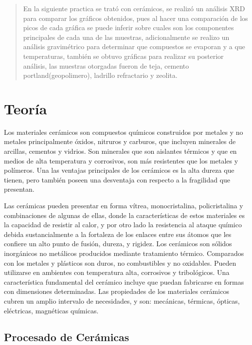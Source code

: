 \documentclass[a4paper, 11pt]{article}
\begin{document}
\renewcommand{\contentsname}{Lista de Contenidos}
\renewcommand{\listfigurename}{Lista de Figuras}
\tableofcontents
\listoffigures
\thispagestyle{empty}
\newpage
\newcommand{\angstrom}{\mbox{\normalfont\AA}}
\begin{abstract}
En la siguiente practica se trató con cerámicos, se realizó un análisis XRD para comparar los gráficos obtenidos, pues al hacer una comparación de los picos de cada gráfica se puede inferir sobre cuales son los componentes principales de cada una de las muestras, adicionalmente se realizo un análisis gravimétrico para determinar que compuestos se evaporan y a que temperaturas, también se obtuvo gráficas para realizar su posterior análisis, las muestras otorgadas fueron de teja, cemento portland(geopolimero), ladrillo refractario y zeolita.
\end{abstract}
\section{Teor\'ia}
\setcounter{page}{1}
Los materiales cerámicos son compuestos químicos construidos por metales y no metales principalmente óxidos, nitruros y carburos, que incluyen minerales de arcillas, cementos y vidrios. Son minerales que son aislantes térmicos y que en medios de alta temperatura y corrosivos, son más resistentes que los metales y polímeros. Una las ventajas principales de los cerámicos es la alta dureza que tienen, pero también poseen una desventaja con respecto a la fragilidad que presentan.

Las cerámicas pueden presentar en forma vítrea, monocristalina, policristalina y combinaciones de algunas de ellas, donde la características de estos materiales es la capacidad de resistir al calor, y por otro lado la resistencia al ataque químico debida sustancialmente a la fortaleza de los enlaces entre sus átomos que les confiere un alto punto de fusión, dureza, y rigidez.
Los cerámicos son sólidos inorgánicos no metálicos producidos mediante tratamiento térmico. Comparados con los metales y plásticos son duros, no combustibles y no oxidables. Pueden utilizarse en ambientes con temperatura alta, corrosivos y tribológicos.
Una característica fundamental del cerámico incluye que puedan fabricarse en formas con dimensiones determinadas. Las propiedades de los materiales cerámicos cubren un amplio intervalo de necesidades, y son: mecánicas, térmicas, ópticas, eléctricas, magnéticas químicas.

\subsection{Procesado de Cerámicas}
\end{document}

